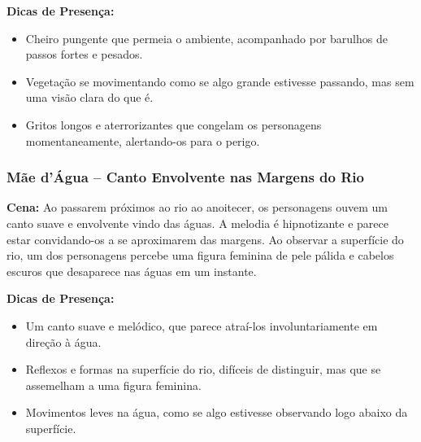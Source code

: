 \textbf{Dicas de Presença:}  
\begin{itemize}
    \item Cheiro pungente que permeia o ambiente, acompanhado por barulhos de passos fortes e pesados.
    \item Vegetação se movimentando como se algo grande estivesse passando, mas sem uma visão clara do que é.
    \item Gritos longos e aterrorizantes que congelam os personagens momentaneamente, alertando-os para o perigo.
\end{itemize}

\subsubsection{Mãe d'Água – Canto Envolvente nas Margens do Rio}

\textbf{Cena:} Ao passarem próximos ao rio ao anoitecer, os personagens ouvem um canto suave e envolvente vindo das águas. A melodia é hipnotizante e parece estar convidando-os a se aproximarem das margens. Ao observar a superfície do rio, um dos personagens percebe uma figura feminina de pele pálida e cabelos escuros que desaparece nas águas em um instante.

\textbf{Dicas de Presença:}  
\begin{itemize}
    \item Um canto suave e melódico, que parece atraí-los involuntariamente em direção à água.
    \item Reflexos e formas na superfície do rio, difíceis de distinguir, mas que se assemelham a uma figura feminina.
    \item Movimentos leves na água, como se algo estivesse observando logo abaixo da superfície.
\end{itemize}



